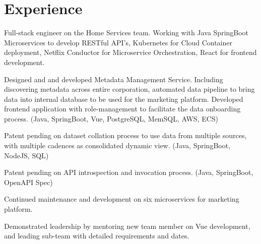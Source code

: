 \documentclass[letterpaper]{deedy-resume-openfont} %
\begin{document}

\lastupdated %


\section{Experience}
\sectionheadersep


\begin{tightemize}
\item Full-stack engineer on the Home Services team. Working with Java SpringBoot Microservices to develop RESTful API's, Kubernetes for Cloud Container deployment, Netflix Conductor for Microservice Orchestration, React for frontend development. 
\end{tightemize}

\sectionsep %



\begin{tightemize}
\item Designed and and developed Metadata Management Service. Including discovering metadata across entire corporation, automated data pipeline to bring data into internal database to be used for the marketing platform. Developed frontend application with role-management to facilitate the data onboarding process. (Java, SpringBoot, Vue, PostgreSQL, MemSQL, AWS, ECS)
\item Patent pending on dataset collation process to use data from multiple sources, with multiple cadences as consolidated dynamic view. (Java, SpringBoot, NodeJS, SQL)
\item Patent pending on API introspection and invocation process. (Java, SpringBoot, OpenAPI Spec)
\item Continued maintenance and development on six microservices for marketing platform.
\item Demonstrated leadership by mentoring new team member on Vue development, and leading sub-team with detailed requirements and dates.
\end{tightemize}
\end{document}
